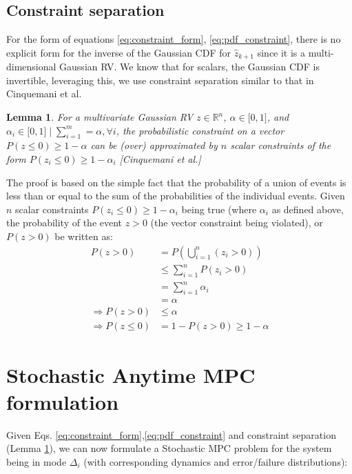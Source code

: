 \documentclass{article}[14pt]
\newtheorem{lemma}[theorem]{Lemma}
\newenvironment{proof}[1][Proof]{\begin{trivlist}
\item[\hskip \labelsep {\bfseries #1}]}{\end{trivlist}}
\begin{document}
	\subsection{Constraint separation}

	For the form of equations \ref{eq:constraint_form}, \ref{eq:pdf_constraint}, there is no explicit form for the inverse of the Gaussian CDF for $\hat{z}_{k+1}$ since it is a multi-dimensional Gaussian RV. We know that for scalars, the Gaussian CDF is invertible, leveraging this, we use constraint separation similar to that in Cinquemani et al. 

	\begin{lemma}
		\label{lem:constr_sep_lemma}
		For a multivariate Gaussian RV $z\in\mathbb{R}^n$, $\alpha\in\lbrack0,1\rbrack $, and $\alpha_i\in\lbrack0,1\rbrack\mid\sum_{i=1}^m=\alpha,\forall i$, the probabilistic constraint on a vector $P(z\leq0)\geq1-\alpha$ can be (over) approximated by $n$ scalar constraints of the form $P(z_i\leq0)\geq1-\alpha_i$ [Cinquemani et al.]

	\end{lemma}
	\begin{proof}
		The proof is based on the simple fact that the probability of a union of events is less than or equal to the sum of the probabilities of the individual events. Given $n$ scalar constraints $P(z_i\leq0)\geq1-\alpha_i$ being true (where $\alpha_i$ as defined above, the probability of the event $z>0$ (the vector constraint being violated), or $P(z>0)$ be written as:
		\begin{subequations}
			\begin{align}
				P(z>0)&=P(\bigcup_{i=1}^n(z_i>0)) \nonumber \\
			       &\leq \sum_{i=1}^nP(z_i>0) \nonumber \\
				      &=\sum_{i=1}^n\alpha_i \nonumber \\
				      &=\alpha \nonumber \\
				\Rightarrow P(z>0) &\leq \alpha \nonumber \\
				      \Rightarrow P(z\leq0) &= 1-P(z>0) \geq 1-\alpha 
			\end{align}
		\end{subequations}
	\end{proof}

\section{Stochastic Anytime MPC formulation}

Given Eqs. \ref{eq:constraint_form},\ref{eq:pdf_constraint} and constraint separation (Lemma \ref{lem:constr_sep_lemma}), we can now formulate a Stochastic MPC problem for the system being in mode $\Delta_i$ (with corresponding dynamics and error/failure distributions):



	
\end{document}

